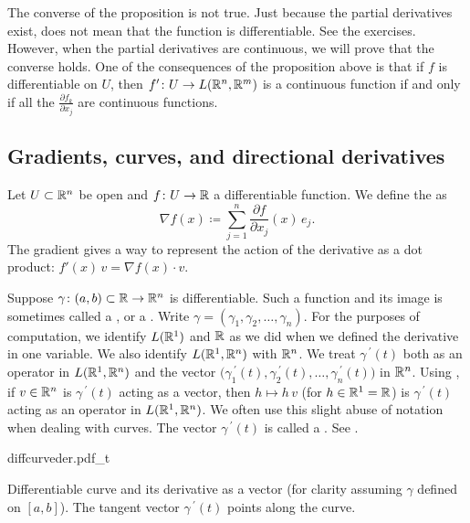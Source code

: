 The converse of the proposition is not true.  Just because the partial
derivatives exist, does not mean that the function is differentiable.  See
the exercises.
However, when the partial derivatives are continuous, we will prove that the
converse holds.
One of the consequences of the proposition above is that if $f$
is differentiable on $U$, then $f' \colon U \to
L({\mathbb{R}}^n,{\mathbb{R}}^m)$ is a continuous function if and only if
all the $\frac{\partial f_k}{\partial x_j}$ are continuous functions.

\subsection{Gradients, curves, and directional derivatives}

Let $U \subset {\mathbb{R}}^n$ be open and $f \colon U \to {\mathbb{R}}$ a differentiable
function.  We define
the \emph{} as
\begin{equation*}
\nabla f (x) \coloneqq \sum_{j=1}^n \frac{\partial f}{\partial x_j} (x)\, e_j .
\end{equation*}
The gradient gives a way to represent the action of
the derivative as a dot product: $f'(x)\,v = \nabla f(x) \cdot v$.

Suppose $\gamma \colon (a,b) \subset {\mathbb{R}} \to {\mathbb{R}}^n$ is differentiable.
Such a function and its image is sometimes called a \emph{},
or a \emph{}.
Write $\gamma =
(\gamma_1,\gamma_2,\ldots,\gamma_n)$.
For the purposes of computation,
we identify $L({\mathbb{R}}^1)$ and ${\mathbb{R}}$ as we did when we defined the
derivative in one variable.
We also identify $L({\mathbb{R}}^1,{\mathbb{R}}^n)$ with ${\mathbb{R}}^n$.
We treat $\gamma^{\:\prime}(t)$ both as an operator in
$L({\mathbb{R}}^1,{\mathbb{R}}^n)$ and the vector
$\bigl(\gamma_1^{\:\prime}(t),
\gamma_2^{\:\prime}(t),\ldots,\gamma_n^{\:\prime}(t)\bigr)$
in ${\mathbb{R}}^n$.
Using ,
if $v\in {\mathbb{R}}^n$ is $\gamma^{\:\prime}(t)$ acting as a vector,
then $h \mapsto h \, v$ (for $h \in {\mathbb{R}}^1 = {\mathbb{R}}$) is
$\gamma^{\:\prime}(t)$ acting as an operator
in $L({\mathbb{R}}^1,{\mathbb{R}}^n)$.
We often use this 
slight abuse of notation when dealing with curves.
The vector $\gamma^{\:\prime}(t)$ is called a \emph{}.
See .
\begin{myfigureht}
{diffcurveder.pdf_t}
\caption{Differentiable curve and its derivative as a
vector (for clarity assuming $\gamma$ defined on $[a,b]$).
The tangent vector $\gamma^{\:\prime}(t)$ points along the curve.\label{fig:difcurveder}}
\end{myfigureht}

